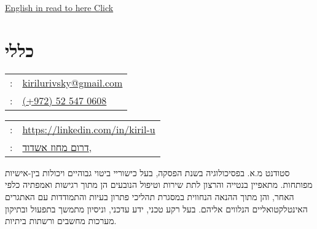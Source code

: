 \setRTL
\hspace{.25\textwidth}
\begin{minipage}[t]{.5\textwidth}
	\par{\par}
\end{minipage}

 \begin{minipage}[t]{1.0\textwidth}
	{\footnotesize\hfill{}\color{gray}
		\hfill{}\hyperref[sec:basicinfoeng]{English in read to here Click}	
	}
 \end{minipage}
\section{כללי}
\label{sec:basicinfoheb}
\unsetRTL
\setLTR
\begin{minipage}[t]{.5\linewidth}
	\begin{tabular}{rp{.75\linewidth}}
		\baselineskip=20pt
		\email{} : &\href{mailto:kirilurivsky@gmail.com}{kirilurivsky@gmail.com}\\
		\phone{} : &\href{tel:972525470608}{(+972) 52 547 0608}
	\end{tabular}
\end{minipage}
\begin{minipage}[t]{.5\linewidth}
	\begin{tabular}{rl}
		\linkedin{} : &\href{https://www.linkedin.com/in/kiril-u}{https://linkedin.com/in/kiril-u}\\
		\location{} : &\href{https://goo.gl/maps/MSacjpSy7vZSKykP7}{דרום מחוז אשדוד,}
	\end{tabular}
\end{minipage}	
\unsetLTR
\unsetRTL
\setRTL
\begin{minipage}[t]{1\linewidth}
	\vspace{0.25cm} %
סטודנט מ.א. בפסיכולוגיה בשנת הפסקה, בעל כישוריי ביטוי גבוהיים ויכולות בין-אישיות מפותחות. מתאפיין בנטייה והרצון לתת שירות וטיפול הנובעים הן מתוך רגישות ואמפתיה כלפי האחר, והן מתוך ההנאה הנחווית במסגרת תהליכי פתרון בעיות והתמודדות עם האתגרים האינטלקטואליים הנלווים אליהם. בעל רקע טכני, ידע עדכני, וניסיון מתמשך בתפעול ובתיקון מערכות מחשבים ורשתות ביתיות. 
\end{minipage}

